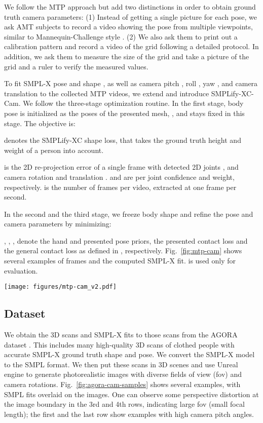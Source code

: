 \documentclass[10pt,twocolumn,letterpaper,usenames,dvipsnames]{article}
\begin{document}
We follow the MTP approach but add two distinctions in order to obtain ground truth camera parameters:
(1) Instead of getting a single picture for each pose, we ask AMT subjects to record a video showing the pose from multiple viewpoints, similar to Mannequin-Challenge style \cite{li2019learning}.
(2) We also ask them to print out a calibration pattern and record a video of the grid following a detailed protocol. In addition, we ask them to measure the size of the grid and take a picture of the grid and a ruler to verify the measured values.

To fit SMPL-X pose  and shape , as well as camera pitch , roll , yaw , 
and camera translation  to the collected MTP videos, we extend \smplifyxc and introduce SMPLify-XC-Cam. 
We follow the three-stage optimization routine.
In the first stage, body pose  is initialized as the poses of the presented mesh, , and stays fixed in this stage. The objective is:

 denotes the SMPLify-XC shape loss, that takes the ground truth height and weight of a person into account. 

is the 2D re-projection error of a single frame  with detected 2D joints , and camera rotation  and translation .  and are per joint confidence and weight, respectively.  is the number of frames per video, extracted at one frame per second. 

In the second and the third stage, we freeze body shape  and refine the pose  and camera parameters by minimizing: 

, , ,  denote the hand and presented pose priors, the presented contact loss and the general contact loss as defined in \cite{Mueller:CVPR:21}, respectively.
Fig.~\ref{fig:mtp-cam} shows several examples of \mtpcam frames and the computed SMPL-X fit.
\mtpcam is used only for evaluation.
\begin{figure*}
    \centering
    \texttt{[image: figures/mtp-cam\_v2.pdf]}
    \caption{\textbf{\mtpcam benchmark samples.}}
    \label{fig:mtp-cam}
\end{figure*}

\subsection{\agoracam Dataset}
We obtain the 3D scans and SMPL-X fits to those scans from the AGORA dataset \cite{patel2021agora}. 
This includes many high-quality 3D scans of clothed people with accurate SMPL-X ground truth shape and pose. 
We convert the SMPL-X model to the SMPL format.
We then put these scans in 3D scenes and use Unreal engine \cite{unrealengine} to generate photorealistic images with diverse fields of view (fov) and camera rotations.
Fig.~\ref{fig:agora-cam-samples} shows several examples, with SMPL fits overlaid on the images.
One can observe some perspective distortion at the image boundary in the 3rd and 4th rows, indicating large fov (small focal length); the first and the last row show examples with high camera pitch angles.
\end{document}
